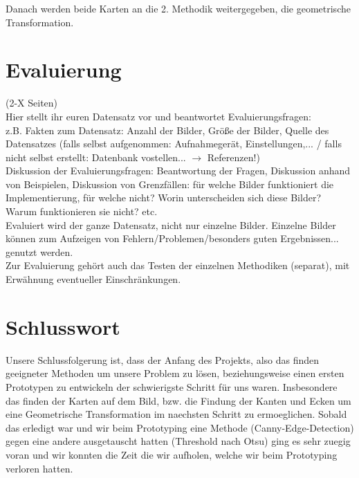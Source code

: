 \documentclass[paper=A4, deutsch]{scrartcl}
\begin{document}
Danach werden beide Karten an die 2. Methodik weitergegeben, die geometrische Transformation.


\newpage

\section{Evaluierung}
(2-X Seiten)\\
Hier stellt ihr euren Datensatz vor und beantwortet Evaluierungsfragen:\\
z.B. Fakten zum Datensatz: Anzahl der Bilder, Größe der Bilder, Quelle des Datensatzes (falls selbst aufgenommen: Aufnahmegerät, Einstellungen,... / falls nicht selbst erstellt: Datenbank vostellen... $\to$ Referenzen!)\\
Diskussion der Evaluierungsfragen: Beantwortung der Fragen, Diskussion anhand von Beispielen, Diskussion von Grenzfällen: für welche Bilder funktioniert die Implementierung, für welche nicht? Worin unterscheiden sich diese Bilder? Warum funktionieren sie nicht? etc.\\
Evaluiert wird der ganze Datensatz, nicht nur einzelne Bilder. Einzelne Bilder können zum Aufzeigen von Fehlern/Problemen/besonders guten Ergebnissen... genutzt werden.\\
Zur Evaluierung gehört auch das Testen der einzelnen Methodiken (separat), mit Erwähnung eventueller Einschränkungen.

\section{Schlusswort}
Unsere Schlussfolgerung ist, dass der Anfang des Projekts, also das finden geeigneter Methoden um unsere Problem zu lösen,
beziehungsweise einen ersten Prototypen zu entwickeln der schwierigste Schritt für uns waren. Insbesondere das finden der Karten
auf dem Bild, bzw. die Findung der Kanten und Ecken um eine Geometrische Transformation im naechsten Schritt zu ermoeglichen.
Sobald das erledigt war und wir beim Prototyping eine Methode (Canny-Edge-Detection) gegen eine andere ausgetauscht hatten (Threshold nach Otsu)
ging es sehr zuegig voran und wir konnten die Zeit die wir aufholen, welche wir beim Prototyping verloren hatten.
\end{document}

